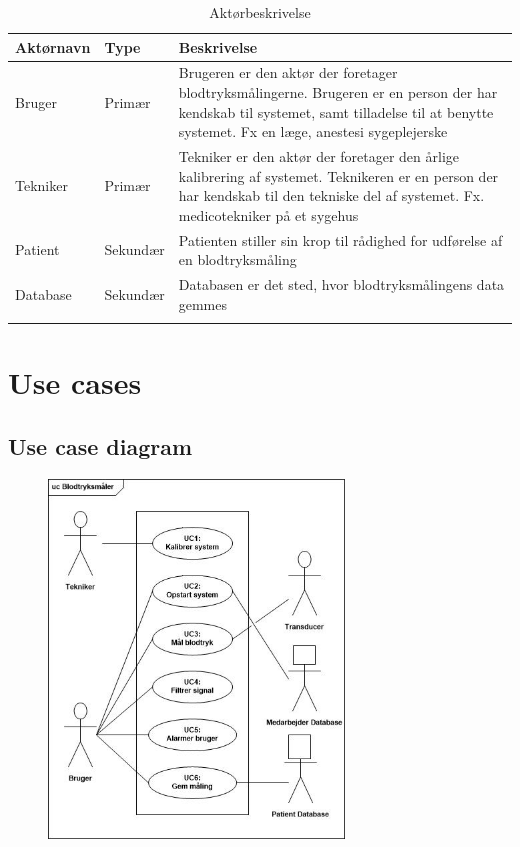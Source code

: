 \begin{longtabu}to 
	{\large \textbf{Aktørnavn}} & {\large \textbf{Type}} & {\large \textbf{Beskrivelse}}\\ \toprule
	Bruger & Primær & Brugeren er den aktør der foretager blodtryksmålingerne. Brugeren er en person der har kendskab til systemet, samt tilladelse til at benytte systemet. Fx en læge, anestesi sygeplejerske \\
	Tekniker & Primær & Tekniker er den aktør der foretager den årlige kalibrering af systemet. Teknikeren er en person der har kendskab til den tekniske del af systemet. Fx. medicotekniker på et sygehus\\
	Patient & Sekundær & Patienten stiller sin krop til rådighed for udførelse af en blodtryksmåling\\
	Database & Sekundær & Databasen er det sted, hvor blodtryksmålingens data gemmes \\ \bottomrule
\caption{Aktørbeskrivelse}
\label{Aktoerbeskrivelse}
\end{longtabu}

\section{Use cases}
\subsection{Use case diagram}
\begin{figure}[H]
	\centering
	\includegraphics[width=0.7\textwidth]{Figurer/ISE/UseCaseDiagram}
\end{figure}


